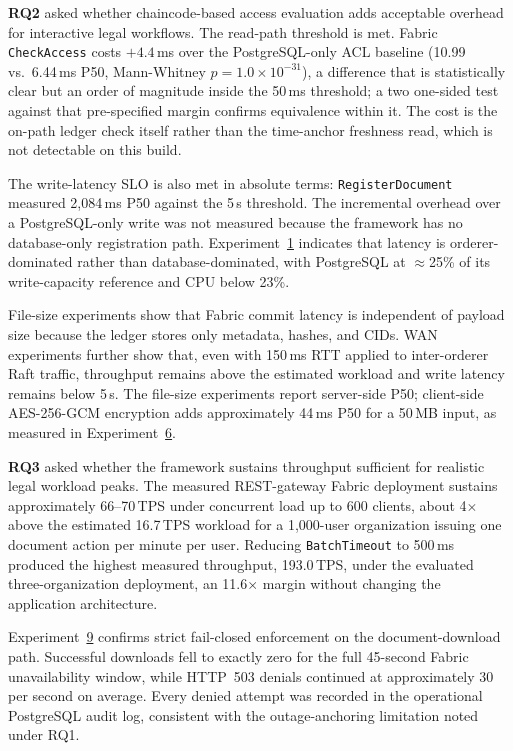 \documentclass[preprint,12pt]{elsarticle}
\begin{document}
\textbf{RQ2} asked whether chaincode-based access evaluation adds acceptable
overhead for interactive legal workflows. The read-path threshold is met.
Fabric \texttt{CheckAccess} costs $+4.4$\,ms over the PostgreSQL-only ACL
baseline (10.99 vs.\ 6.44\,ms P50, Mann-Whitney $p = 1.0\times10^{-31}$), a
difference that is statistically clear but an order of magnitude inside the
50\,ms threshold; a two one-sided test against that pre-specified margin
confirms equivalence within it. The cost is the on-path ledger check itself
rather than the time-anchor freshness read, which is not detectable on this
build.

The write-latency \textsc{SLO} is also met in absolute terms:
\texttt{RegisterDocument} measured 2{,}084\,ms P50 against the 5\,s threshold.
The incremental overhead over a PostgreSQL-only write was not measured
because the framework has no database-only registration path.
Experiment~\hyperref[sec:exp_scalability]{1} indicates that latency is
orderer-dominated rather than database-dominated, with PostgreSQL at
$\approx$25\% of its write-capacity reference and CPU below 23\%.

File-size experiments show that Fabric commit latency is independent of
payload size because the ledger stores only metadata, hashes, and CIDs. WAN
experiments further show that, even with 150\,ms RTT applied to inter-orderer
Raft traffic, throughput remains above the estimated workload and write
latency remains below 5\,s. The file-size experiments report server-side P50;
client-side AES-256-GCM encryption adds approximately 44\,ms P50 for a 50\,MB
input, as measured in Experiment~\hyperref[sec:exp_crypto]{6}.

\textbf{RQ3} asked whether the framework sustains throughput sufficient for
realistic legal workload peaks. The measured REST-gateway Fabric deployment
sustains approximately 66--70\,TPS under concurrent load up to 600 clients, about
4$\times$ above the estimated 16.7\,TPS workload for a 1,000-user
organization issuing one document action per minute per user. Reducing
\texttt{BatchTimeout} to 500\,ms produced the highest measured throughput,
193.0\,TPS, under the evaluated three-organization deployment, an
11.6$\times$ margin without changing the application architecture.

Experiment~\hyperref[sec:exp_failclosed]{9} confirms strict fail-closed
enforcement on the document-download path. Successful downloads fell to
exactly zero for the full 45-second Fabric unavailability window, while
HTTP~503 denials continued at approximately 30 per second on average. Every denied attempt was
recorded in the operational \mbox{PostgreSQL} audit log, consistent with the
outage-anchoring limitation noted under RQ1.
\end{document}
